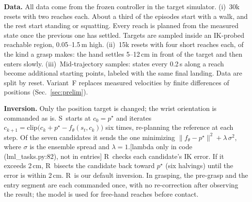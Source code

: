 \documentclass[conference]{IEEEtran}
\newif\ifdraft \drafttrue
\newcommand{\dnote}[1]{\ifdraft{\color{red}\footnotesize[#1]}\fi}
\newcommand{\Sinv}{\textsc{S}} %
\newcommand{\Rr}{\textsc{R}}   %
\begin{document}
\textbf{Data.} All data come from the frozen controller in the target simulator. (i)~30k resets with two reaches each. About a third of the episodes start with a walk, and the rest start standing or squatting. Every reach is planned from the measured state once the previous one has settled. Targets are sampled inside an IK-probed reachable region, 0.05--1.5\,m high. (ii)~15k resets with four short reaches each, of the kind a grasp makes: the hand settles 5--12\,cm in front of the target and then enters slowly. (iii)~Mid-trajectory samples: states every 0.2\,s along a reach become additional starting points, labeled with the same final landing. Data are split by reset. Variant~F replaces measured velocities by finite differences of positions (Sec.~\ref{sec:prelim}).

\textbf{Inversion.} Only the position target is changed; the wrist orientation is commanded as is. \Sinv\ starts at $c_0=p^\star$ and iterates $c_{k+1}=\mathrm{clip}\big(c_k+p^\star-f_\theta(s_t,c_k)\big)$ six times, re-planning the reference at each step. Of the seven candidates it sends the one minimizing $\lVert f_\theta-p^\star\rVert^2+\lambda\,\sigma^2$, where $\sigma$ is the ensemble spread and $\lambda=1$.\dnote{lambda only in code (lml\_tasks.py:82), not in entries}
\Rr\ checks each candidate's IK error. If it exceeds 2\,cm, \Rr\ bisects the candidate back toward $p^\star$ (six halvings) until the error is within 2\,cm. \Rr\ is our default inversion. In grasping, the pre-grasp and the entry segment are each commanded once, with no re-correction after observing the result; the model is used for free-hand reaches before contact.
\end{document}
